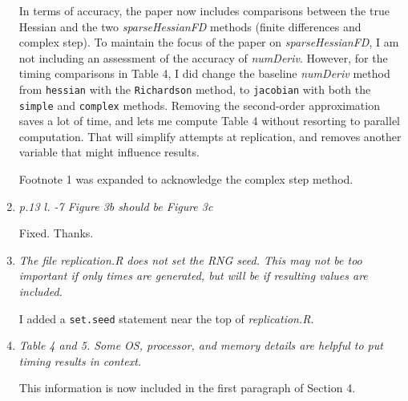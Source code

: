 \documentclass{article}
\newcommand{\pkg}[1]{\emph{#1}}
\newcommand{\filename}[1]{\textit{#1}}
\newcommand{\code}[1]{\texttt{#1}}
\newcommand{\func}[1]{\code{#1}}
\newcommand{\class}[1]{\textsl{#1}}
\newcommand{\method}[1]{\func{#1}}
\newenvironment{revQuote}{\itshape}{\vspace{\baselineskip}}
\newenvironment{response}{\normalfont}{\vspace{\baselineskip}}
\begin{document}
\begin{enumerate}[align=left]
\begin{response}
In terms of accuracy, the paper now includes comparisons between the true
Hessian and the two \class{sparseHessianFD} methods (finite differences
and complex step). To maintain the focus of the paper on
\pkg{sparseHessianFD}, I am not including an assessment of the accuracy of
\pkg{numDeriv}.  However, for the
timing comparisons in Table 4, I did
change the baseline \pkg{numDeriv} method from \func{hessian} with the
\method{Richardson} method, to \func{jacobian} with both the
\method{simple} and 
\method{complex} methods. Removing the second-order approximation saves
a lot of time, and lets me compute Table 4 without resorting to
parallel computation. That will simplify attempts at replication, and
removes another variable that might influence results.

Footnote 1 was expanded to acknowledge the complex step method.



\end{response}


\item \begin{revQuote}
 p.13  l. -7  Figure 3b  should be Figure 3c
  \end{revQuote}

\begin{response}
  Fixed.  Thanks.
\end{response}


\item \begin{revQuote}
 The file replication.R does not set the RNG seed. This may not be too
important if only times are generated, but will be if resulting values are
included.
    
  \end{revQuote}

\begin{response}
  I added a \func{set.seed} statement near the top of \filename{replication.R}.
\end{response}


\item \begin{revQuote}
Table 4 and 5. Some OS, processor, and memory details are helpful to put
timing results in context.
  \end{revQuote}

\begin{response}
  This information is now included in the first paragraph of Section 4.
\end{response}



\end{enumerate}
\end{document}
